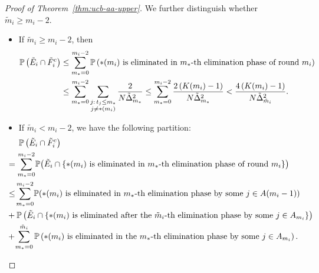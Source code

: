 \documentclass[11pt]{article}
\begin{document}
\begin{proof}[Proof of Theorem~\ref{thm:ucb-aa-upper}]
We further distinguish whether $\tilde{m}_i\geq m_i-2$.
\begin{itemize}
    \item If $\tilde{m}_i\geq m_i-2$, then
    \begin{align}
\mathbb{P}\left(\tilde{E}_i\cap\tilde{F}_i^c\right)&\leq  \sum_{m_*=0}^{m_i-2}\mathbb{P} \left(\text{$*(m_i)$ is eliminated in $m_*$-th elimination phase of round }m_i\right)\notag\\
&\leq \sum_{m_*=0}^{m_i-2}\sum_{\substack{j :\,t_j\leq m_*\\j\neq *(m_i)}}\frac{2}{N\tilde{\Delta}_{m_*}^2}\leq \sum_{m_*=0}^{m_i-2}\frac{2\left(K(m_i)-1\right)}{N\tilde{\Delta}_{m_*}^2}<\frac{4\left(K(m_i)-1\right)}{N\tilde{\Delta}_{\tilde{m}_i}^2}.
\label{eq: A-3 G-3 b2 upper bound, when tilde m big}
\end{align}
    \item If $\tilde{m}_i< m_i-2$, we have the following partition:
\begin{align}
&\mathbb{P}\left(\tilde{E}_i\cap\tilde{F}_i^c\right)\notag \\
   & \!\!\!\!\!\!\!\!\!=\sum_{m_*=0}^{m_i-2}\!\mathbb{P}\! \left(\tilde{E}_i\cap\left\{\text{$*(m_i)$ is eliminated in $m_*$-th elimination phase of round }m_i\right\}\right)\notag \\
    & \!\!\!\!\!\!\!\!\!\leq\!\sum_{m_*=0}^{m_i-2} \!\mathbb{P}\!\left(\text{$*(m_i)$ is eliminated in $m_*$-th elimination phase } \text{by some }j\in A(m_i-1)\right)\notag\\
    &\!\!\!\!\!\! \!\!\!+\mathbb{P}\left(\tilde{E}_i\cap\left\{\text{$*(m_i)$ is eliminated after the $\tilde{m}_i$-th elimination phase } \text{by some }j\in A_{m_i}\right\}\right)\notag\\
    & \!\!\!\!\!\! \!\!\!+\!\sum_{m_*=0}^{\tilde{m}_i}\mathbb{P}\left(\text{$*(m_i)$ is eliminated in the $m_*$-th elimination phase } \text{by some }j\in A_{m_i}\right).
    \label{eq: UCB-A3 G-3 b2 partition}
\end{align}
   

\end{itemize}
\end{proof}
\end{document}
